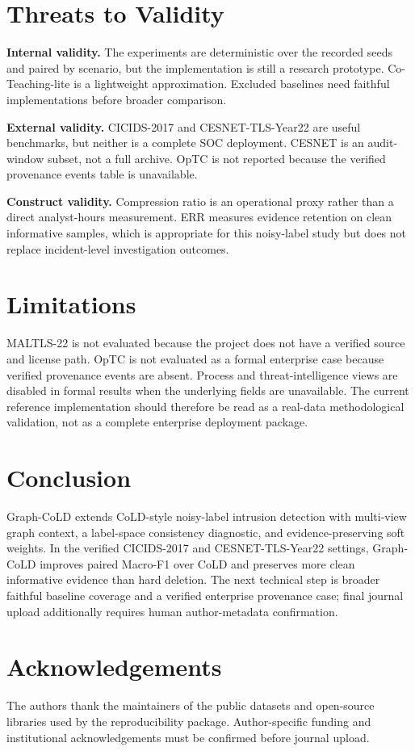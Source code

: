 \documentclass[preprint,review,12pt]{elsarticle}
\begin{document}
\section{Threats to Validity}
\textbf{Internal validity.} The experiments are deterministic over the recorded
seeds and paired by scenario, but the implementation is still a research
prototype. Co-Teaching-lite is a lightweight approximation. Excluded baselines need
faithful implementations before broader comparison.

\textbf{External validity.} CICIDS-2017 and CESNET-TLS-Year22 are useful
benchmarks, but neither is a complete SOC deployment. CESNET is an audit-window
subset, not a full archive. OpTC is not reported because the verified provenance
events table is unavailable.

\textbf{Construct validity.} Compression ratio is an operational proxy rather
than a direct analyst-hours measurement. ERR measures evidence retention on clean
informative samples, which is appropriate for this noisy-label study but does
not replace incident-level investigation outcomes.

\section{Limitations}
MALTLS-22 is not evaluated because the project does not have a verified source
and license path. OpTC is not evaluated as a formal enterprise case because
verified provenance events are absent. Process and threat-intelligence views are
disabled in formal results when the underlying fields are unavailable. The
current reference implementation should therefore be read as a real-data
methodological validation, not as a complete enterprise deployment package.

\section{Conclusion}
Graph-CoLD extends CoLD-style noisy-label intrusion detection with multi-view
graph context, a label-space consistency diagnostic, and evidence-preserving
soft weights. In the verified CICIDS-2017 and CESNET-TLS-Year22 settings,
Graph-CoLD improves paired Macro-F1 over CoLD and preserves more clean
informative evidence than hard deletion. The next technical step is broader faithful baseline coverage and a verified
enterprise provenance case; final journal upload additionally requires human
author-metadata confirmation.

\section*{Acknowledgements}
The authors thank the maintainers of the public datasets and open-source
libraries used by the reproducibility package. Author-specific funding and
institutional acknowledgements must be confirmed before journal upload.
\end{document}

